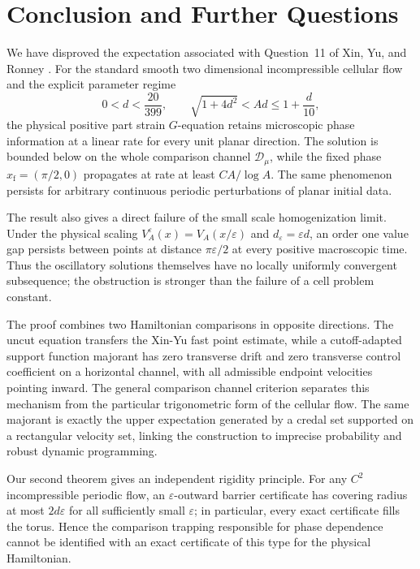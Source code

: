 \documentclass[11pt,reqno,noamsfonts]{amsart}
\theoremstyle{definition}
\theoremstyle{remark}
\begin{document}
\section{Conclusion and Further Questions}\label{sec:questions}

We have disproved the expectation associated with Question~11 of Xin,
Yu, and Ronney \cite{XinYuRonney2024}.  For the standard smooth two dimensional incompressible
cellular flow and the explicit parameter regime
\[
  0<d<\frac{20}{399},
  \qquad
  \sqrt{1+4d^2}<Ad\le1+\frac d{10},
\]
the physical positive part strain $G$-equation retains microscopic
phase information at a linear rate for every unit planar direction.
The solution is bounded below on the whole comparison channel
$\mathcal D_\mu$, while the fixed phase
$x_{\mathrm f}=(\pi/2,0)$ propagates at rate at least
$CA/\log A$.  The same phenomenon persists for arbitrary continuous
periodic perturbations of planar initial data.

The result also gives a direct failure of the small scale homogenization
limit.  Under the physical scaling
$V_A^\varepsilon(x)=V_A(x/\varepsilon)$ and
$d_\varepsilon=\varepsilon d$, an order one value gap persists between
points at distance $\pi\varepsilon/2$ at every positive macroscopic
time.  Thus the oscillatory solutions themselves have no locally
uniformly convergent subsequence; the obstruction is stronger than the
failure of a cell problem constant.

The proof combines two Hamiltonian comparisons in opposite directions.
The uncut equation transfers the Xin-Yu fast point estimate, while a
cutoff-adapted support function majorant has zero transverse drift and
zero transverse control coefficient on a horizontal channel, with all
admissible endpoint velocities pointing inward.  The general comparison
channel criterion separates this mechanism from the particular
trigonometric form of the cellular flow.  The same majorant is exactly
the upper expectation generated by a credal set supported on a
rectangular velocity set, linking the construction to imprecise
probability and robust dynamic programming.

Our second theorem gives an independent rigidity principle.  For any
$C^2$ incompressible periodic flow, an $\varepsilon$-outward barrier
certificate has covering radius at most $2d\varepsilon$ for all
sufficiently small $\varepsilon$; in particular, every exact
certificate fills the torus.  Hence the comparison trapping responsible
for phase dependence cannot be identified with an exact certificate of
this type for the physical Hamiltonian.
\end{document}
